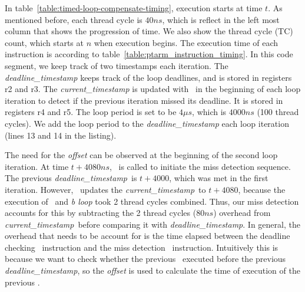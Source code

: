 In table~\ref{table:timed-loop-compensate-timing}, execution starts at time $t$.
As mentioned before, each thread cycle is $40ns$, which is reflect in the left most column that shows the progression of time.
We also show the thread cycle (TC) count, which starts at $n$ when execution begins.
The execution time of each instruction is according to table~\ref{table:ptarm_instruction_timing}.
In this code segment, we keep track of two timestamps each iteration. 
The \emph{deadline\_timestamp} keeps track of the loop deadlines, and is stored in registers r2 and r3.  
The \emph{current\_timestamp} is updated with \gettime\ in the beginning of each loop iteration to detect if the previous iteration missed its deadline.
It is stored in registers r4 and r5. 
The loop period is set to be $4 \mu s$, which is $4000 ns$ (100 thread cycles).
We add the loop period to the \emph{deadline\_timestamp} each loop iteration (lines 13 and 14 in the listing).  

\newcommand{\currentt}{\emph{current\_timestamp}}
\newcommand{\deadlinet}{\emph{deadline\_timestamp}}


The need for the \emph{offset} can be observed at the beginning of the second loop iteration.
At time $t+4080ns$, \gettime\ is called to initiate the miss detection sequence.
The previous \deadlinet\ is $t+4000$, which was met in the first iteration.  
However, \gettime\ updates the \currentt\ to $t+4080$, because the execution of \delayuntil\ and \emph{b loop} took 2 thread cycles combined. 
Thus, our miss detection accounts for this by subtracting the 2 thread cycles ($80ns$) overhead from \currentt\ before comparing it with \deadlinet.
In general, the overhead that needs to be account for is the time elapsed between the deadline checking \delayuntil\ instruction and the miss detection \gettime\ instruction.
Intuitively this is because we want to check whether the previous \delayuntil\ executed before the previous \deadlinet, so the \emph{offset} is used to calculate the time of execution of the previous \delayuntil.  

